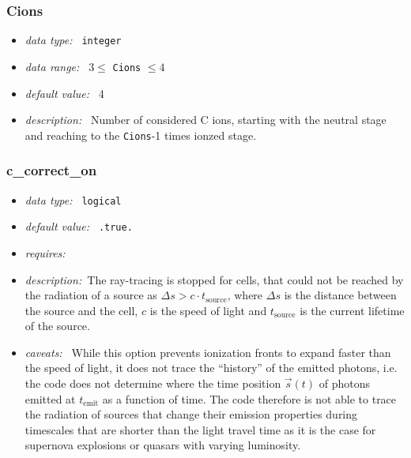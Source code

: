 \documentclass[a4paper,10pt]{article}
\begin{document}
\subsubsection{Cions}
\label{opt:cions}
\begin{itemize}
 \item \textit{data type:~} \texttt{integer}
 \item \textit{data range:~}  $3 \leq$ \texttt{Cions} $\leq 4$ 
 \item \textit{default value:~} 4
 \item \textit{description:~} Number of considered C ions, starting with the 
 neutral stage and reaching to  the \texttt{Cions}-1 times ionzed stage.
\end{itemize}


\subsubsection{c\_correct\_on}
\label{opt:ccorrecton}
\begin{itemize}
 \item \textit{data type:~} \texttt{logical}
 \item \textit{default value:~} \texttt{.true.}
 \item \textit{requires:~}
 \item \textit{description:~}The ray-tracing is stopped for cells, that could
  not be reached by the radiation of a source as 	
  $\Delta s > c \cdot t_\mathrm{source}$, where
  $\Delta s$ is the distance between the source and the cell, $c$ is the speed 
  of light and $t_\mathrm{source}$ is the current lifetime of the source.
 \item \textit{caveats:~} While this option prevents ionization fronts to expand
  faster than the speed of light, it does not trace the ``history'' of the 
  emitted photons, i.e. the code does not determine where the time position $ 
  \vec{s}(t)$ of photons emitted at  $t_\mathrm{emit}$ as a function of time. 
  The code therefore is not able to trace the radiation 
  of sources that change their emission properties during timescales that are 
  shorter than the light travel time as it is the  case for supernova 
  explosions  or quasars with varying luminosity.   
\end{itemize}
\end{document}
